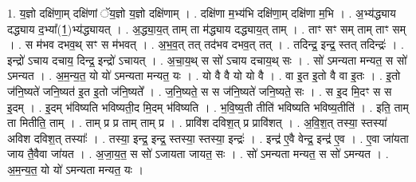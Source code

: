 \documentclass[17pt]{extarticle}
\begin{document}
1. य॒ज्ञो दक्षि॑णा॒म् दक्षि॑णां ॅय॒ज्ञो य॒ज्ञो दक्षि॑णाम् । . दक्षि॑णा म॒भ्य॑भि दक्षि॑णा॒म् दक्षि॑णा म॒भि । . अ॒भ्य॑द्ध्याय दद्ध्याय द॒भ्या᳚(1॒)भ्य॑द्ध्यायत् । . अ॒द्ध्या॒य॒त् ताम् ता म॑द्ध्याय दद्ध्याय॒त् ताम् । . ताꣳ सꣳ सम् ताम् ताꣳ सम् । . स म॑भव दभव॒थ् सꣳ स म॑भवत् । . अ॒भ॒व॒त् तत् तद॑भव दभव॒त् तत् । . तदिन्द्र॒ इन्द्र॒ स्तत् तदिन्द्रः॑ । . इन्द्रो॑ ऽचाय दचाय॒ दिन्द्र॒ इन्द्रो॑ ऽचायत् । . अ॒चा॒य॒थ् स सो॑ ऽचाय दचाय॒थ् सः । . सो॑ ऽमन्यता मन्यत॒ स सो॑ ऽमन्यत । . अ॒म॒न्य॒त॒ यो यो॑ ऽमन्यता मन्यत॒ यः । . यो वै वै यो यो वै । . वा इ॒त इ॒तो वै वा इ॒तः । . इ॒तो ज॑नि॒ष्यते॑ जनि॒ष्यत॑ इ॒त इ॒तो ज॑नि॒ष्यते᳚ । . ज॒नि॒ष्यते॒ स स ज॑नि॒ष्यते॑ जनि॒ष्यते॒ सः । . स इ॒द मि॒दꣳ स स इ॒दम् । . इ॒दम् भ॑विष्यति भविष्यती॒द मि॒दम् भ॑विष्यति । . भ॒वि॒ष्य॒ती तीति॑ भविष्यति भविष्य॒तीति॑ । . इति॒ ताम् ता मितीति॒ ताम् । . ताम् प्र प्र ताम् ताम् प्र । . प्रावि॑श दविश॒त् प्र प्रावि॑शत् । . अ॒वि॒श॒त् तस्या॒ स्तस्या॑ अविश दविश॒त् तस्याः᳚ । . तस्या॒ इन्द्र॒ इन्द्र॒ स्तस्या॒ स्तस्या॒ इन्द्रः॑ । . इन्द्र॑ ए॒वै वेन्द्र॒ इन्द्र॑ ए॒व । . ए॒वा जा॑यता जाय तै॒वैवा जा॑यत । . अ॒जा॒य॒त॒ स सो॑ ऽजायता जायत॒ सः । . सो॑ ऽमन्यता मन्यत॒ स सो॑ ऽमन्यत । . अ॒म॒न्य॒त॒ यो यो॑ ऽमन्यता मन्यत॒ यः । \newline
\end{document}
